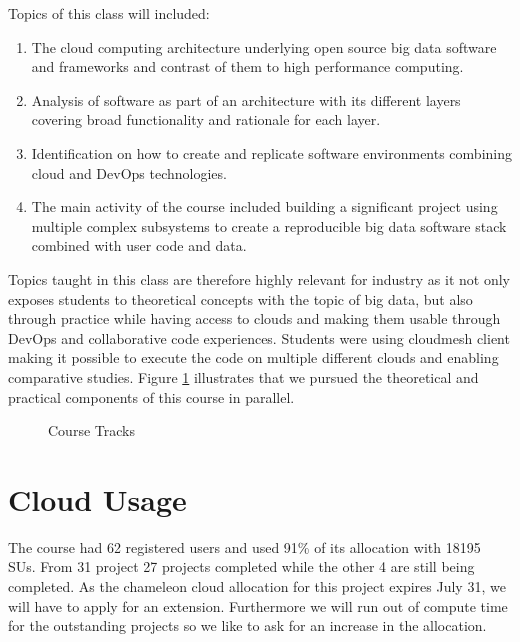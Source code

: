 \documentclass[sigconf]{acmart}
\begin{document}
Topics of this class will included:

\begin{enumerate}
\item The cloud computing architecture underlying open source big data
  software and frameworks and contrast of them to high performance
  computing.
\item Analysis of software as part of an architecture with its
  different layers covering broad functionality and rationale for each
  layer.
\item Identification on how to create and replicate software
  environments combining cloud and DevOps technologies.
\item The main activity of the course included building a significant
  project using multiple complex subsystems to create a reproducible
  big data software stack  combined with user code and data. 
\end{enumerate}


Topics taught in this class are therefore highly relevant for industry
as it not only exposes students to theoretical concepts with the topic
of big data, but also through practice while having access to clouds
and making them usable through DevOps and collaborative code
experiences. Students were using cloudmesh client
\cite{www-cloudmesh-client} making it possible to execute the code on
multiple different clouds and enabling comparative studies. Figure
\ref{F:course} illustrates that we pursued the theoretical and
practical components of this course in parallel.

\begin{figure}[htbp]
\centering
{}
\caption{Course Tracks}
\label{F:course}
\end{figure}


\section{Cloud Usage}

The course had 62 registered users and used 91\% of its allocation
with 18195 SUs.  From 31 project 27 projects completed while the other
4 are still being completed. As the chameleon cloud allocation for
this project expires July 31, we will have to apply for an extension.
Furthermore we will run out of compute time for the outstanding
projects so we like to ask for an increase in the allocation.
\end{document}

